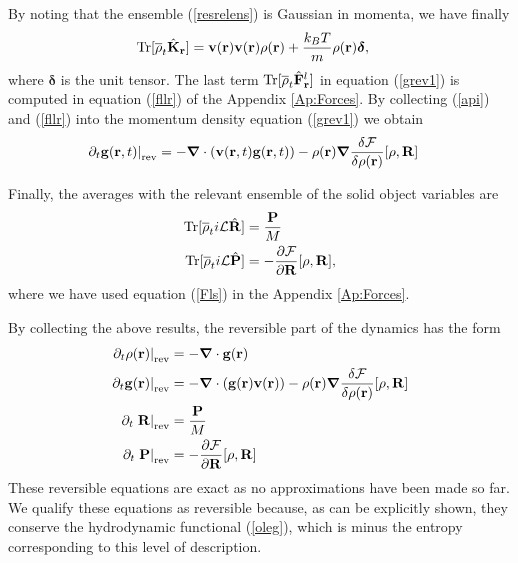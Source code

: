 \documentclass[b5paper,openright,10pt]{book}
\begin{document}
By noting that the ensemble (\ref{resrelens}) is Gaussian in momenta, we have finally 
\begin{align}
  {\rm Tr}[\overline{\rho}_t \hat{{\bf K}}_{\bf r}] &=
{\bf v}({\bf r}){\bf v}({\bf r}){\rho}({\bf r})+\frac{k_BT}{m}\rho({\bf r})\boldsymbol{\delta},
\label{api}
\end{align}
where $\boldsymbol{\delta}$ is the unit  tensor.  The last term $ {\rm
Tr}[\overline{\rho}_t \hat{\bf F}^{l}_{\bf r}]$  in equation (\ref{grev1}) is
computed  in   equation  (\ref{fllr})  of  the   Appendix \ref{Ap:Forces}.   By  collecting
(\ref{api})  and  (\ref{fllr})  into  the  momentum  density  equation
(\ref{grev1}) we obtain
\begin{align}
\left.\partial_t {\bf g}({\bf r},t)\right|_{\rm rev} 
&=-\boldsymbol{\nabla}\cdot\left({\bf v}({\bf r},t)  {\bf g}({\bf r},t)  \right)
-\rho({\bf r})\boldsymbol{\nabla}
\frac{\delta {\cal F}}{\delta\rho({\bf r})}[\rho,{\bf R}]
\label{grev}
\end{align}

Finally, the averages with the relevant ensemble of the solid object variables are
\begin{align}
  {\rm Tr}[\overline{\rho}_t  i{\cal L}\hat{\bf R}] 
&=\frac{\bf P}{M}
\nonumber\\
{\rm Tr}[\overline{\rho}_t  i{\cal L}\hat{\bf P}] 
&=-\frac{\partial {\cal F}}{\partial {\bf R}}[\rho,{\bf R}],
\end{align}
where we have used equation (\ref{Fls}) in the Appendix \ref{Ap:Forces}.

By collecting the  above results, the reversible part  of the dynamics
has the form
\begin{align}
\left.  \partial_t\rho({\bf r})\right|_{\rm rev}&=-\boldsymbol{\nabla}\cdot{\bf g}({\bf r})
\nonumber\\
\left.  \partial_t{\bf g}({\bf r})\right|_{\rm rev}&=-\boldsymbol{\nabla}\cdot\left({\bf g}({\bf r}){\bf v}({\bf r})\right)
-\rho({\bf r})\boldsymbol{\nabla} \frac{\delta {\cal F}}{\delta\rho({\bf r})}[\rho,{\bf R}]
\nonumber\\
\partial_t\left. {\bf R}\right|_{\rm rev}&=\frac{\bf P}{M}
\nonumber\\
\partial_t\left.{\bf P}\right|_{\rm rev}&=-\frac{\partial {\cal F}}{\partial {\bf R}}[\rho,{\bf R}]
\label{rev}
\end{align}
These reversible  equations are exact  as no approximations  have been
made so far. We qualify these  equations as reversible because, as can
be  explicitly  shown,  they   conserve  the  hydrodynamic  functional
(\ref{oleg}), which  is minus the entropy corresponding
  to this level of description.
\end{document}
